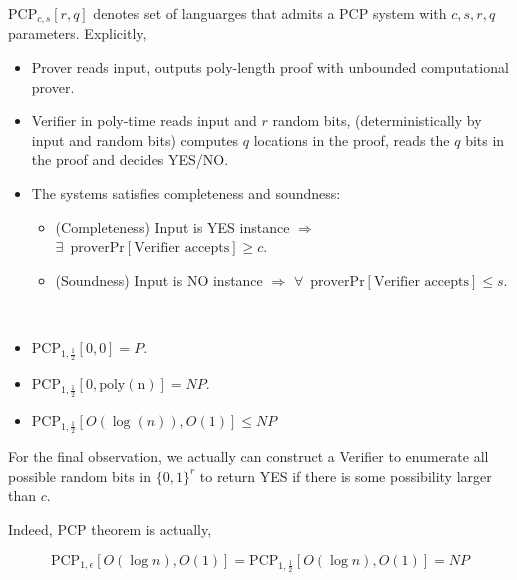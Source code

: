 \begin{definition}
    $ \mathrm{PCP}_{c,s}[r,q] $ denotes set of languarges that admits a PCP system with  $ c,s,r,q  $ parameters. Explicitly,
    \begin{itemize}
        \item Prover reads input, outputs poly-length proof with unbounded computational prover.
        \item Verifier in poly-time reads input and  $ r $ random bits, (deterministically by input and random bits) computes  $ q $ locations in the proof, reads the  $ q $ bits in the proof and decides YES/NO.
        \item The systems satisfies  completeness and soundness:
        \begin{itemize}
            \item (Completeness) Input is YES instance  $ \Rightarrow  $  $ \exists\,\text{ prover}\mathrm{Pr}[\text{Verifier accepts}] \geq c $.
            \item (Soundness) Input is NO instance  $ \Rightarrow  $  $ \forall\,\text{ prover}\mathrm{Pr}[\text{Verifier accepts}] \leq s $. 
        \end{itemize}
    \end{itemize}
\end{definition}
\begin{observation}
    \,
    \begin{itemize}
        \item  $ \mathrm{PCP}_{1,\frac{1}{2}}[0,0]=P $.
        \item  $ \mathrm{PCP}_{1,\frac{1}{2}}[0,\mathrm{poly(n)}]=NP $.
        \item  $ \mathrm{PCP}_{1,\frac{1}{2}}[O(\log(n)),O(1)] \leq NP $   
    \end{itemize}
\end{observation}
For the final observation, we actually can construct a Verifier to enumerate all possible random bits in $ \{0,1\}^r $ to return YES if there is some possibility larger than  $ c $.

Indeed, PCP theorem is actually,
\begin{theorem}
    \[\mathrm{PCP}_{1,\epsilon}[O(\log n),O(1)]=\mathrm{PCP}_{1,\frac{1}{2}}[O(\log n),O(1)]=NP \]
\end{theorem}

